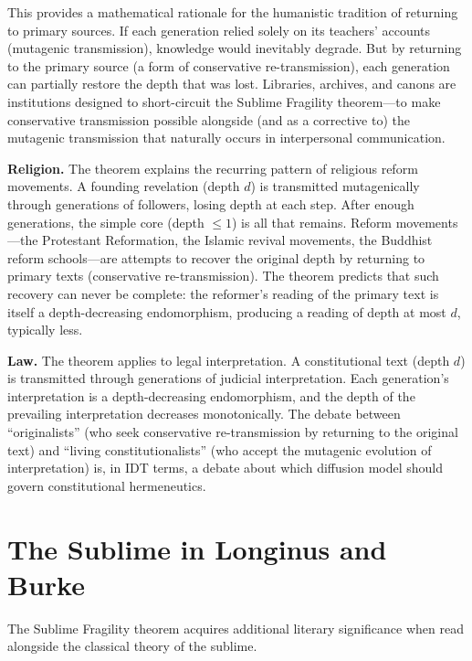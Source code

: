 \documentclass[11pt,openany]{book}
\theoremstyle{definition}
\theoremstyle{plain}
\theoremstyle{remark}
\begin{document}
This provides a mathematical rationale for the humanistic tradition of returning to primary sources. If each generation relied solely on its teachers' accounts (mutagenic transmission), knowledge would inevitably degrade. But by returning to the primary source (a form of conservative re-transmission), each generation can partially restore the depth that was lost. Libraries, archives, and canons are institutions designed to short-circuit the Sublime Fragility theorem---to make conservative transmission possible alongside (and as a corrective to) the mutagenic transmission that naturally occurs in interpersonal communication.

\textbf{Religion.} The theorem explains the recurring pattern of religious reform movements. A founding revelation (depth $d$) is transmitted mutagenically through generations of followers, losing depth at each step. After enough generations, the simple core (depth $\leq 1$) is all that remains. Reform movements---the Protestant Reformation, the Islamic revival movements, the Buddhist reform schools---are attempts to recover the original depth by returning to primary texts (conservative re-transmission). The theorem predicts that such recovery can never be complete: the reformer's reading of the primary text is itself a depth-decreasing endomorphism, producing a reading of depth at most $d$, typically less.

\textbf{Law.} The theorem applies to legal interpretation. A constitutional text (depth $d$) is transmitted through generations of judicial interpretation. Each generation's interpretation is a depth-decreasing endomorphism, and the depth of the prevailing interpretation decreases monotonically. The debate between ``originalists'' (who seek conservative re-transmission by returning to the original text) and ``living constitutionalists'' (who accept the mutagenic evolution of interpretation) is, in IDT terms, a debate about which diffusion model should govern constitutional hermeneutics.

\section{The Sublime in Longinus and Burke}

The Sublime Fragility theorem acquires additional literary significance when read alongside the classical theory of the sublime.
\end{document}
